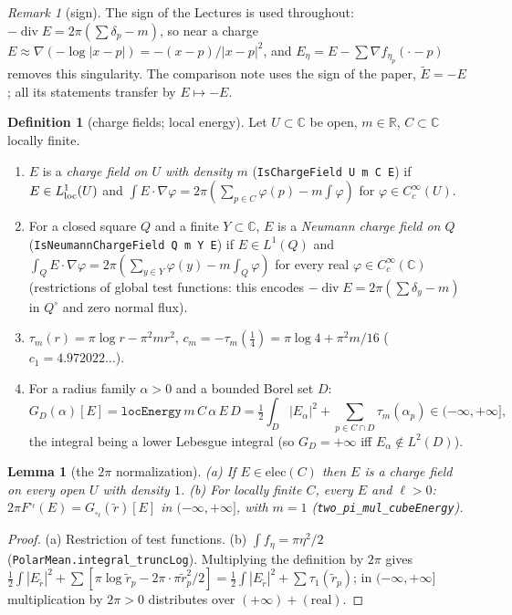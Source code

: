 \documentclass[11pt]{article}
\newtheorem{lemma}[theorem]{Lemma}
\theoremstyle{definition}
\newtheorem{definition}[theorem]{Definition}
\theoremstyle{remark}
\newtheorem{remark}[theorem]{Remark}
\newcommand{\R}{\mathbb R}
\newcommand{\C}{\mathbb C}
\DeclareMathOperator{\Div}{div}
\begin{document}
\begin{remark}[sign]\label{rem:sign}
The sign of the Lectures is used throughout: $-\Div E=2\pi(\sum\delta_p-m)$, so near a charge $E\approx\nabla(-\log|x-p|)=-(x-p)/|x-p|^2$,
and $E_\eta=E-\sum\nabla f_{\eta_p}(\cdot-p)$ removes this singularity. The comparison note uses the sign of the paper,
$\tilde E=-E$; all its statements transfer by $E\mapsto-E$.
\end{remark}

\begin{definition}[charge fields; local energy]\label{def:local}
Let $U\subset\C$ be open, $m\in\R$, $C\subset\C$ locally finite.
\begin{enumerate}[label=(\alph*)]
\item $E$ is a \emph{charge field on $U$ with density $m$} (\texttt{IsChargeField U m C E}) if $E\in L^1_{\rm loc}(U)$ and
  $\int E\cdot\nabla\varphi=2\pi(\sum_{p\in C}\varphi(p)-m\int\varphi)$ for $\varphi\in C_c^\infty(U)$.
\item For a closed square $Q$ and a finite $Y\subset\C$, $E$ is a \emph{Neumann charge field on $Q$}
  (\texttt{IsNeumannChargeField Q m Y E}) if $E\in L^1(Q)$ and
  $\int_QE\cdot\nabla\varphi=2\pi(\sum_{y\in Y}\varphi(y)-m\int_Q\varphi)$ for every real $\varphi\in C^\infty_c(\C)$
  (restrictions of global test functions: this encodes $-\Div E=2\pi(\sum\delta_y-m)$ in $Q^\circ$ and zero normal flux).
\item $\tau_m(r)=\pi\log r-\pi^2mr^2$, $c_m=-\tau_m(\tfrac14)=\pi\log4+\pi^2m/16$
  ($c_1=4.972022\ldots$).
\item For a radius family $\alpha>0$ and a bounded Borel set $D$:
  \[
  G_D(\alpha)[E]=\texttt{locEnergy}\,m\,C\,\alpha\,E\,D=\tfrac12\int_D|E_\alpha|^2+\sum_{p\in C\cap D}\tau_m(\alpha_p)\in(-\infty,+\infty],
  \]
  the integral being a lower Lebesgue integral (so $G_D=+\infty$ iff $E_\alpha\notin L^2(D)$).
\end{enumerate}
\end{definition}

\begin{lemma}[the $2\pi$ normalization]\label{lem:norm}
(a) If $E\in\mathrm{elec}(C)$ then $E$ is a charge field on every open $U$ with density $1$.
(b) For locally finite $C$, every $E$ and $\ell>0$: $2\pi F^{\square_\ell}(E)=G_{\square_\ell}(\tilde r)[E]$ in $(-\infty,+\infty]$,
with $m=1$ (\texttt{two\_pi\_mul\_cubeEnergy}).
\end{lemma}
\begin{proof}
(a) Restriction of test functions. (b) $\int f_\eta=\pi\eta^2/2$ (\texttt{PolarMean.integral\_truncLog}). Multiplying the definition by $2\pi$ gives
$\frac12\int|E_{\tilde r}|^2+\sum[\pi\log\tilde r_p-2\pi\cdot\pi\tilde r_p^2/2]=\frac12\int|E_{\tilde r}|^2+\sum\tau_1(\tilde r_p)$;
in $(-\infty,+\infty]$ multiplication by $2\pi>0$ distributes over $(+\infty)+(\text{real})$.
\end{proof}
\end{document}
